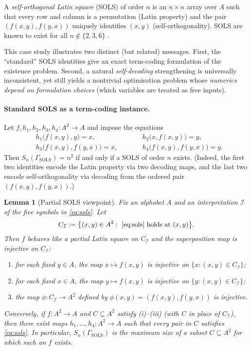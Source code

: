 \documentclass[11pt]{article}
\theoremstyle{plain}
\newtheorem{lemma}[theorem]{Lemma}
\theoremstyle{definition}
\theoremstyle{definition}
\theoremstyle{remark}
\newcommand{\A}{A}
\newcommand{\Sn}{S_n}
\begin{document}
A \emph{self-orthogonal Latin square} (SOLS) of order $n$ is an $n\times n$ array over $\A$ such that every row
and column is a permutation (Latin property) and the pair $(f(x,y),f(y,x))$ uniquely identifies $(x,y)$
(self-orthogonality).
SOLS are known to exist for all $n\notin\{2,3,6\}$ \cite{brayton1974self,hedayat1975}.

\medskip
\noindent
This case study illustrates two distinct (but related) messages.
First, the ``standard'' SOLS identities give an exact term-coding formulation of the existence problem.
Second, a natural \emph{self-decoding} strengthening is universally inconsistent, yet still yields a
nontrivial optimisation problem whose \emph{numerics depend on formulation choices} (which variables are treated
as free inputs).

\paragraph{Standard SOLS as a term-coding instance.}
Let $f,h_1,h_2,h_3,h_4:\A^2\to\A$ and impose the equations
\begin{equation}
\label{eq:sols}
\begin{aligned}
  &h_1\bigl(f(x,y),y\bigr)=x,\qquad
  &&h_2\bigl(x,f(x,y)\bigr)=y,\\
  &h_3\bigl(f(x,y),f(y,x)\bigr)=x,\qquad
  &&h_4\bigl(f(x,y),f(y,x)\bigr)=y.
\end{aligned}
\end{equation}
Then $\Sn(\Gamma_{\mathrm{SOLS}})=n^2$ if and only if a SOLS of order $n$ exists.
(Indeed, the first two identities encode the Latin property via two decoding maps, and the last two encode
self-orthogonality via decoding from the ordered pair $(f(x,y),f(y,x))$.)

\begin{lemma}[Partial SOLS viewpoint]
\label{lem:sols-partial}
Fix an alphabet $\A$ and an interpretation $\mathcal I$ of the five symbols in \eqref{eq:sols}.
Let
\[
  C_{\mathcal I}:=\bigl\{(x,y)\in \A^2:\ \eqref{eq:sols}\ \text{holds at }(x,y)\bigr\}.
\]
Then $f$ behaves like a \emph{partial Latin square} on $C_{\mathcal I}$ and the superposition map is injective
on $C_{\mathcal I}$:
\begin{enumerate}[label=(\roman*),leftmargin=2.2em]
\item for each fixed $y\in\A$, the map $x\mapsto f(x,y)$ is injective on $\{x:(x,y)\in C_{\mathcal I}\}$;
\item for each fixed $x\in\A$, the map $y\mapsto f(x,y)$ is injective on $\{y:(x,y)\in C_{\mathcal I}\}$;
\item the map $\phi:C_{\mathcal I}\to \A^2$ defined by $\phi(x,y)=(f(x,y),f(y,x))$ is injective.
\end{enumerate}
Conversely, if $f:\A^2\to\A$ and $C\subseteq\A^2$ satisfy (i)--(iii) (with $C$ in place of $C_{\mathcal I}$),
then there exist maps $h_1,\dots,h_4:\A^2\to\A$ such that every pair in $C$ satisfies \eqref{eq:sols}.
In particular, $\Sn(\Gamma_{\mathrm{SOLS}})$ is the maximum size of a subset $C\subseteq\A^2$ for which such
an $f$ exists.
\end{lemma}
\end{document}
